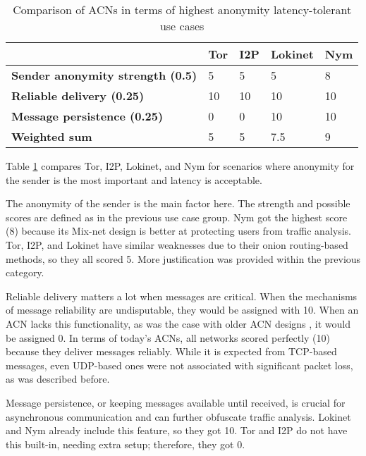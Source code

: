 \begin{table}[!ht]
\caption{Comparison of ACNs in terms of highest anonymity latency-tolerant use cases}
\label{tab:high_latency_uc}
\small
\begin{tabular}{|p{}|p{}|p{}|p{}|p{}|}
\hline
\textbf{} & \textbf{Tor} & \textbf{I2P} & \textbf{Lokinet} & \textbf{Nym} \\
\hline
\textbf{Sender anonymity strength (0.5)} & 5 & 5 & 5 & 8 \\
\hline
\textbf{Reliable delivery (0.25)} & 10 & 10 & 10 & 10 \\
\hline
\textbf{Message persistence (0.25)} & 0 & 0 & 10 & 10 \\
\hline
\textbf{Weighted sum} & 5 & 5 & 7.5 & 9 \\
\hline
\end{tabular}
\end{table}

Table \ref{tab:high_latency_uc} compares Tor, I2P, Lokinet, and Nym for scenarios where anonymity for the sender is the most important and latency is acceptable.

The anonymity of the sender is the main factor here. The strength and possible scores are defined as in the previous use case group. Nym got the highest score (8) because its Mix-net design is better at protecting users from traffic analysis. Tor, I2P, and Lokinet have similar weaknesses due to their onion routing-based methods, so they all scored 5. More justification was provided within the previous category.

Reliable delivery matters a lot when messages are critical. When the mechanisms of message reliability are undisputable, they would be assigned with 10. When an ACN lacks this functionality, as was the case with older ACN designs \cite{mix-net-reliability}, it would be assigned 0. In terms of today's ACNs, all networks scored perfectly (10) because they deliver messages reliably. While it is expected from TCP-based messages, even UDP-based ones were not associated with significant packet loss, as was described before.

Message persistence, or keeping messages available until received, is crucial for asynchronous communication \cite{two-cents-post-office} and can further obfuscate traffic analysis. Lokinet and Nym already include this feature, so they got 10. Tor and I2P do not have this built-in, needing extra setup; therefore, they got 0.

